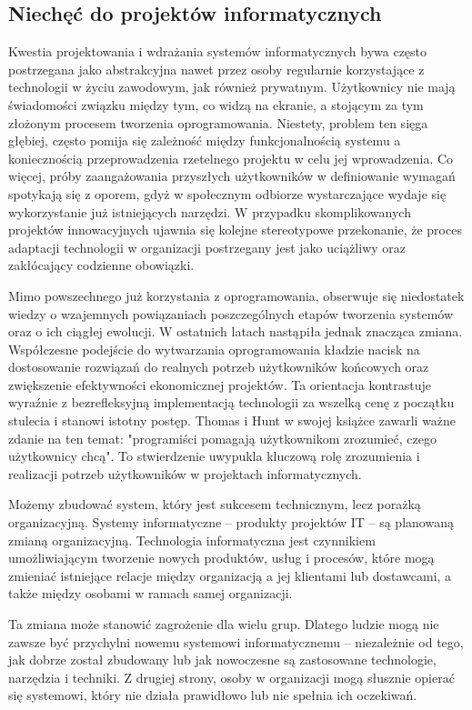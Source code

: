 \subsection{Niechęć do projektów informatycznych}
Kwestia projektowania i wdrażania systemów informatycznych bywa często postrzegana jako abstrakcyjna nawet przez osoby regularnie korzystające z technologii w życiu zawodowym, jak również prywatnym. Użytkownicy nie mają świadomości związku między tym, co widzą na ekranie, a stojącym za tym złożonym procesem tworzenia oprogramowania. Niestety, problem ten sięga głębiej, często pomija się zależność między funkcjonalnością systemu a koniecznością przeprowadzenia rzetelnego projektu w celu jej wprowadzenia. Co więcej, próby zaangażowania przyszłych użytkowników w definiowanie wymagań spotykają się z oporem, gdyż w społecznym odbiorze wystarczające wydaje się wykorzystanie już istniejących narzędzi. W przypadku skomplikowanych projektów innowacyjnych ujawnia się kolejne stereotypowe przekonanie, że proces adaptacji technologii w organizacji postrzegany jest jako uciążliwy oraz zakłócający codzienne obowiązki.

Mimo powszechnego już korzystania z oprogramowania, obserwuje się niedostatek wiedzy o wzajemnych powiązaniach poszczególnych etapów tworzenia systemów oraz o ich ciągłej ewolucji. W ostatnich latach nastąpiła jednak znacząca zmiana. Współczesne podejście do wytwarzania oprogramowania kładzie nacisk na dostosowanie rozwiązań do realnych potrzeb użytkowników końcowych oraz zwiększenie efektywności ekonomicznej projektów. Ta orientacja kontrastuje wyraźnie z bezrefleksyjną implementacją technologii za wszelką cenę z początku stulecia i stanowi istotny postęp.\autocite{ITPMChmielarz} Thomas i Hunt w swojej książce zawarli ważne zdanie na ten temat: "programiści pomagają użytkownikom zrozumieć, czego użytkownicy chcą".\autocite{pragmatic} To stwierdzenie uwypukla kluczową rolę zrozumienia i realizacji potrzeb użytkowników w projektach informatycznych.

Możemy zbudować system, który jest sukcesem technicznym, lecz porażką organizacyjną. Systemy informatyczne – produkty projektów IT – są planowaną zmianą organizacyjną. Technologia informatyczna jest czynnikiem umożliwiającym tworzenie nowych produktów, usług i procesów, które mogą zmieniać istniejące relacje między organizacją a jej klientami lub dostawcami, a także między osobami w ramach samej organizacji.  

Ta zmiana może stanowić zagrożenie dla wielu grup. Dlatego ludzie mogą nie zawsze być przychylni nowemu systemowi informatycznemu – niezależnie od tego, jak dobrze został zbudowany lub jak nowoczesne są zastosowane technologie, narzędzia i techniki. Z drugiej strony, osoby w organizacji mogą słusznie opierać się systemowi, który nie działa prawidłowo lub nie spełnia ich oczekiwań.\autocite{ITPMMarchewka}

